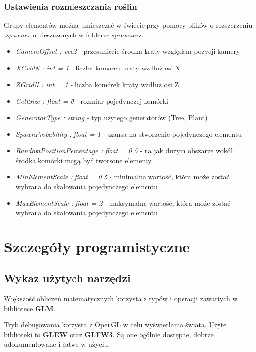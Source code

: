 \documentclass[inz,longabstract]{iithesis}
\begin{document}
        \subsection{Ustawienia rozmieszczania roślin}
        Grupy elementów można umieszczać w świecie przy pomocy plików o rozszerzeniu
        \textit{.spawner} umieszczonych w folderze \textit{sprawners}.
        \begin{itemize}
            \item \textit{CameraOffset : vec2} - przesunięcie środka kraty względem pozycji kamery
            \item \textit{XGridN : int = 1} - liczba komórek kraty wzdłuż osi X
            \item \textit{ZGridN : int = 1} - liczba komórek kraty wzdłuż osi Z
            \item \textit{CellSize : float = 0} - rozmiar pojedynczej komórki
            \item \textit{GeneratorType : string} - typ użytego generatorów (Tree, Plant)
            \item \textit{SpawnProbability : float = 1} - szansa na stworzenie pojedynczego elementu 
            \item \textit{RandomPositionPercentage : float = 0.5} - na jak dużym obszarze wokół środka komórki mogą być tworzone elementy
            \item \textit{MinElementScale : float = 0.5} - minimalna wartość, która może zostać wybrana do skalowania pojedynczego elementu
            \item \textit{MaxElementScale : float = 2} - maksymalna wartość, która może zostać wybrana do skalowania pojedynczego elementu
        \end{itemize}
    
        
\chapter{Szczegóły programistyczne}
    \section{Wykaz użytych narzędzi}
        Większość obliczeń matematycznych korzysta z typów i operacji zawartych w bibliotece \textbf{GLM}.
        
        Tryb debugowania korzysta z OpenGL w celu wyświetlania świata. Użyte biblioteki to \textbf{GLEW} oraz \textbf{GLFW3}. Są one ogólnie dostępne, dobrze udokumentowane i łatwe w użyciu. 
        
\end{document}
